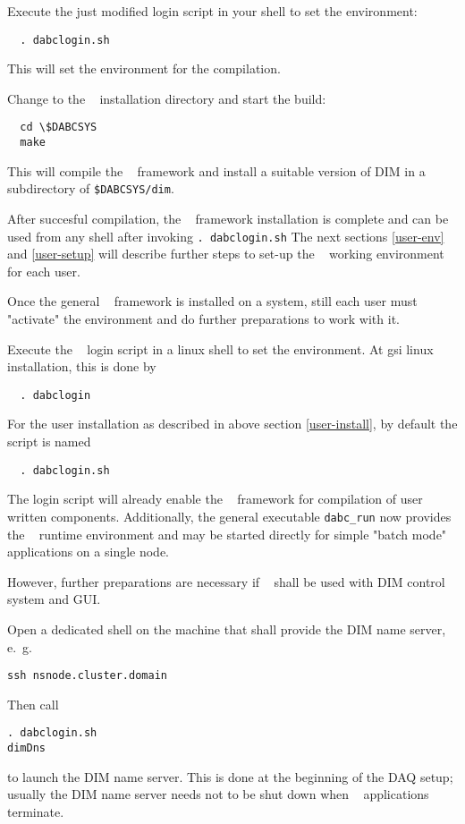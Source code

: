 \item Execute the just modified login script in your shell to set the environment:  
  \begin{verbatim}
  . dabclogin.sh
  \end{verbatim} 
  This will set the environment for the compilation.

\item Change to the \dabc~ installation directory and start the build:
  \begin{verbatim}
  cd \$DABCSYS
  make
  \end{verbatim} 
  This will compile the \dabc~ framework and install a suitable version of DIM in a
  subdirectory of {\tt \$DABCSYS/dim}.

\enum

After succesful compilation, the \dabc~ framework installation is complete
and can be used from any shell after invoking {\tt . dabclogin.sh}
The next sections \ref{user-env} and \ref{user-setup} will describe further steps 
to set-up the \dabc~ working environment for each user.


Once the general \dabc~ framework is installed on a system, still each user
must "activate" the environment and do further preparations to work with it.

\bnum
\item Execute the \dabc~ login script in a linux shell to set the environment.
At gsi linux installation, this is done by  
\begin{verbatim}
  . dabclogin
  \end{verbatim} 
For the user installation as described in above section \ref{user-install},
by default the script is named   
  \begin{verbatim}
  . dabclogin.sh
  \end{verbatim} 
The login script will already enable the \dabc~ framework for
compilation of user written components. Additionally, 
the general executable {\tt dabc\_run} now provides
the \dabc~ runtime environment and may be started directly 
for simple "batch mode" applications on a single node. 

However, further preparations are necessary if \dabc~ shall be used with
DIM control system and GUI.

\item Open a dedicated shell on the machine that shall provide the DIM name server,
e.~g.~ 
\begin{verbatim}
ssh nsnode.cluster.domain
\end{verbatim}
Then call 
\begin{verbatim}
. dabclogin.sh
dimDns  
\end{verbatim} 
to launch the DIM name server. This is done  at the beginning of
the DAQ setup; usually the DIM name server needs not to be shut down 
when \dabc~ applications terminate.

